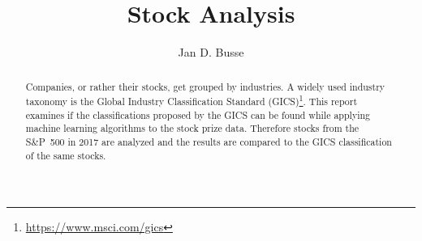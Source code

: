 \documentclass[11pt,paper=a4]{article}
\title{Stock Analysis}
\author{Jan D. Busse}
\begin{document}
	
	\maketitle
%		
%		
%		
%		
%		

	\begin{abstract}
		Companies, or rather their stocks, get grouped by industries. A widely used industry taxonomy is the Global Industry Classification Standard (GICS)\footnote{\hyperlink{https://www.msci.com/gics}{https://www.msci.com/gics}}. This report examines if the classifications proposed by the GICS can be found while applying machine learning algorithms to the stock prize data. Therefore stocks from the S\&P~500 in 2017 are analyzed and the results are compared to the GICS classification of the same stocks.
	\end{abstract}
	
	
	
	
	
	
	
	\clearpage
	
	
	
	
\end{document}
